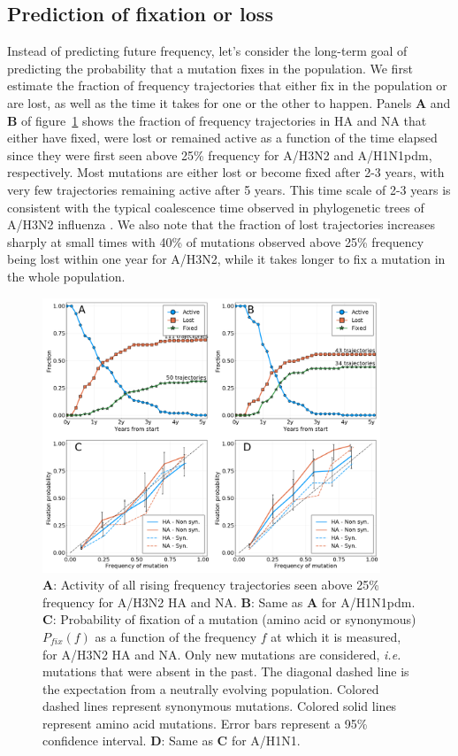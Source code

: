 \documentclass[reprint,amsmath,amssymb,superscriptaddress,showpacs,rmp]{revtex4-1}
\begin{document}
\subsection*{Prediction of fixation or loss}
Instead of predicting future frequency, let's consider the long-term goal of predicting the probability that a mutation fixes in the population.
We first estimate the fraction of frequency trajectories that either fix in the population or are lost, as well as the time it takes for one or the other to happen.
Panels \textbf{A} and \textbf{B} of figure~\ref{fig:fix_loss_active} shows the fraction of frequency trajectories in HA and NA that either have fixed, were lost or remained active as a function of the time elapsed since they were first seen above 25\% frequency for A/H3N2 and A/H1N1pdm, respectively.
Most mutations are either lost or become fixed after 2-3 years, with very few trajectories remaining active after 5 years.
This time scale of 2-3 years is consistent with the typical coalescence time observed in phylogenetic trees of A/H3N2 influenza \citep{rambaut_genomic_2008,yan_phylodynamic_2019}.
We also note that the fraction of lost trajectories increases sharply at small times with 40\% of mutations observed above 25\% frequency being lost within one year for A/H3N2, while it takes longer to fix a mutation in the whole population.

\begin{figure}
	\centering
	\includegraphics[width=0.9\textwidth]{./Figures/Panel2.png}
	\caption{\textbf{A}: Activity of all rising frequency trajectories seen above 25\% frequency for A/H3N2 HA and NA. \textbf{B}: Same as \textbf{A} for A/H1N1pdm. \textbf{C}: Probability of fixation of a mutation (amino acid or synonymous) $P_{fix}(f)$ as a function of the frequency $f$ at which it is measured, for A/H3N2 HA and NA. Only new mutations are considered, \emph{i.e.} mutations that were absent in the past. The diagonal dashed line is the expectation from a neutrally evolving population. Colored dashed lines represent synonymous mutations. Colored solid lines represent amino acid mutations. Error bars represent a 95\% confidence interval. \textbf{D}: Same as \textbf{C} for A/H1N1.}
	\label{fig:fix_loss_active}
\end{figure}
\end{document}
